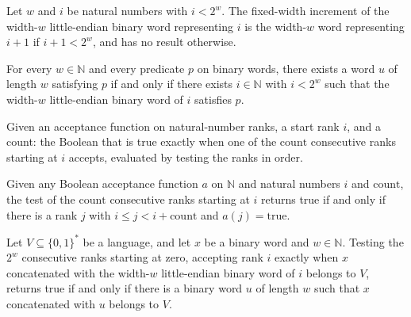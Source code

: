\begin{lemma}
\label{Complexity.enumInc_word}
\leanok
{}
Let $w$ and $i$ be natural numbers with $i<2^w$. The fixed-width increment of the
width-$w$ little-endian binary word representing $i$ is the width-$w$ word representing
$i+1$ if $i+1<2^w$, and has no result otherwise.
\end{lemma}

\begin{lemma}
\label{Complexity.enumCandidates_iff}
\leanok
{}
For every $w\in\mathbb{N}$ and every predicate $p$ on binary words, there exists a word
$u$ of length $w$ satisfying $p$ if and only if there exists $i\in\mathbb{N}$ with
$i<2^w$ such that the width-$w$ little-endian binary word of $i$ satisfies $p$.
\end{lemma}

\begin{definition}
\label{Complexity.enumAny}
\leanok
Given an acceptance function on natural-number ranks, a start rank $i$, and a
count: the Boolean that is true exactly when one of the $\mathrm{count}$
consecutive ranks starting at $i$ accepts, evaluated by testing the ranks in
order.
\end{definition}

\begin{lemma}
\label{Complexity.enumAny_iff}
\leanok
{}
Given any Boolean acceptance function $a$ on $\mathbb{N}$ and natural numbers $i$ and
$\mathrm{count}$, the test of the $\mathrm{count}$ consecutive ranks starting at $i$
returns true if and only if there is a rank $j$ with $i\le j<i+\mathrm{count}$ and
$a(j)=\mathrm{true}$.
\end{lemma}

\begin{lemma}
\label{Complexity.enumAny_certificates}
\leanok
{}
Let $V\subseteq\{0,1\}^*$ be a language, and let $x$ be a binary word and
$w\in\mathbb{N}$. Testing the $2^w$ consecutive ranks starting at zero, accepting rank
$i$ exactly when $x$ concatenated with the width-$w$ little-endian binary word of $i$
belongs to $V$, returns true if and only if there is a binary word $u$ of length $w$
such that $x$ concatenated with $u$ belongs to $V$.
\end{lemma}

